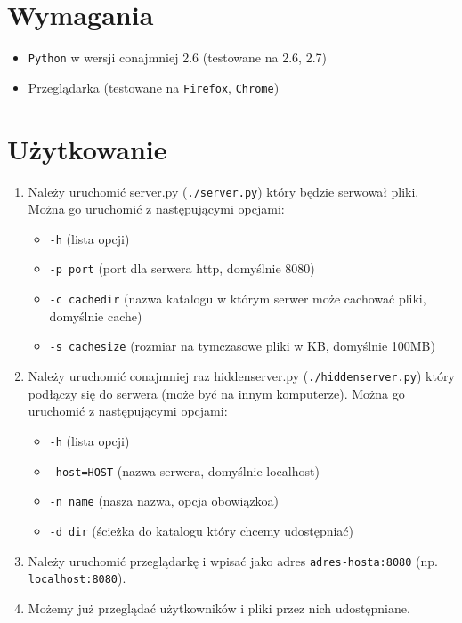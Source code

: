 \documentclass[a4paper,notitlepage]{article}
\begin{document}
\pagestyle{fancy}
\tableofcontents
\section{Wymagania}
\begin{itemize}
\item \texttt{Python} w wersji conajmniej 2.6 (testowane na 2.6, 2.7)
\item Przeglądarka (testowane na \texttt{Firefox}, \texttt{Chrome})
\end{itemize}

\section{Użytkowanie}
\begin{enumerate}
\item Należy uruchomić server.py (\texttt{./server.py}) który będzie serwował pliki. Można go uruchomić z następującymi opcjami:
    \begin{itemize}
    \item \texttt{-h} (lista opcji)
    \item \texttt{-p port} (port dla serwera http, domyślnie 8080)
    \item \texttt{-c cachedir} (nazwa katalogu w którym serwer może cachować pliki, domyślnie cache)
    \item \texttt{-s cachesize} (rozmiar na tymczasowe pliki w KB, domyślnie 100MB)
    \end{itemize}
\item Należy uruchomić conajmniej raz hiddenserver.py (\texttt{./hiddenserver.py}) który podłączy się do serwera (może być na innym komputerze). Można go uruchomić z następującymi opcjami:
    \begin{itemize}
    \item \texttt{-h} (lista opcji)
    \item \texttt{--host=HOST} (nazwa serwera, domyślnie localhost)
    \item \texttt{-n name} (nasza nazwa, opcja obowiązkoa)
    \item \texttt{-d dir} (ścieżka do katalogu który chcemy udostępniać)
    \end{itemize}
\item Należy uruchomić przeglądarkę i wpisać jako adres \texttt{adres-hosta:8080} (np. \texttt{localhost:8080}).
\item Możemy już przeglądać użytkowników i pliki przez nich udostępniane.
\end{enumerate}


   
\end{document}
